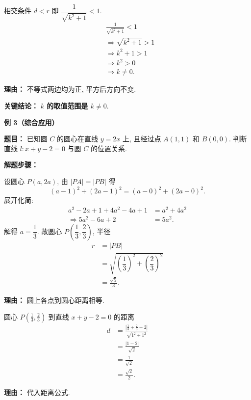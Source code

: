 \begin{examplebox}
\begin{description}[style=nextline, leftmargin=2.8em, labelsep=0.5em, itemsep=0.45em]
		\item[\textbf{第三步（解不等式）：}] 相交条件 $d<r$ 即 $\dfrac{1}{\sqrt{k^2+1}}<1$.
			\[
				\begin{aligned}
					&\frac{1}{\sqrt{k^2+1}}<1 \\
					&\Longrightarrow \sqrt{k^2+1}>1 \\
					&\Longrightarrow k^2+1>1 \\
					&\Longrightarrow k^2>0 \\
					&\Longrightarrow k\neq0.
			\end{aligned}
			\]
			\par\textbf{理由：} 不等式两边均为正, 平方后方向不变.
	\end{description}

	\textbf{\textcolor{CExample}{关键结论：}}
	\textbf{$k$ 的取值范围是 $k\neq0$}.

	\medskip
	\textbf{\textcolor{CExample}{例 3（综合应用）}}

	\textbf{\textcolor{CExample}{题目：}}
	已知圆 $C$ 的圆心在直线 $y=2x$ 上, 且经过点 $A(1,1)$ 和 $B(0,0)$. 判断直线 $l:x+y-2=0$ 与圆 $C$ 的位置关系.

	\textbf{\textcolor{CExample}{解题步骤：}}
	\begin{description}[style=nextline, leftmargin=2.8em, labelsep=0.5em, itemsep=0.45em]
		\item[\textbf{第一步（求圆心半径）：}] 设圆心 $P(a,2a)$, 由 $|PA|=|PB|$ 得
			\[
				(a-1)^2+(2a-1)^2 = (a-0)^2+(2a-0)^2.
			\]
			展开化简:
			\[
				\begin{aligned}
					a^2-2a+1+4a^2-4a+1 &= a^2+4a^2 \\
					\Longrightarrow 5a^2-6a+2 &= 5a^2.
			\end{aligned}
			\]
			解得 $a=\dfrac13$. 故圆心 $P\!\left(\dfrac13,\dfrac23\right)$, 半径
			\[
				\begin{aligned}
					r &= |PB| \\
					&= \sqrt{\left(\dfrac13\right)^2+\left(\dfrac23\right)^2} \\
					&= \frac{\sqrt{5}}{3}.
			\end{aligned}
			\]
			\par\textbf{理由：} 圆上各点到圆心距离相等.

		\item[\textbf{第二步（计算距离）：}] 圆心 $P(\frac13,\frac23)$ 到直线 $x+y-2=0$ 的距离
			\[
				\begin{aligned}
					d &= \frac{\left|\frac13+\frac23-2\right|}{\sqrt{1^2+1^2}} \\
					&= \frac{|1-2|}{\sqrt{2}} \\
					&= \frac{1}{\sqrt{2}} \\
					&= \frac{\sqrt{2}}{2}.
			\end{aligned}
			\]
			\par\textbf{理由：} 代入距离公式.


\end{description}
\end{examplebox}
